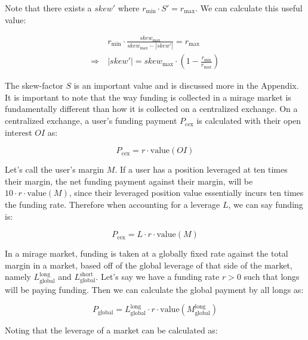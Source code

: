 \documentclass[letterpaper]{article}
\begin{document}
\begin{multicols}{2}
Note that there exists a $skew'$ where $r_{\text{min}} \cdot S' = r_{\text{max}}$. We can calculate this useful value:

\begin{align}
    &r_{\text{min}} \cdot \frac{skew_{\text{max}}}{skew_{\text{max}} - |skew'|} = r_{\text{max}} \\
    \label{eq:skew-at-max-funding}
    \Rightarrow~&|skew'| = skew_{\text{max}} \cdot (1 - \frac{r_{\text{min}}}{r_{\text{max}}})
\end{align}

The skew-factor $S$ is an important value and is discussed more in the Appendix. It is important to note that the way funding is collected in a mirage market is fundamentally different than how it is collected on a centralized exchange. On a centralized exchange, a user's funding payment $P_{\text{cex}}$ is calculated with their open interest $OI$ as:

\begin{equation}
    \label{eq:cex-funding}
    P_{\text{cex}} = r \cdot \text{value}(OI)
\end{equation}

Let's call the user's margin $M$. If a user has a position leveraged at ten times their margin, the net funding payment against their margin, will be $10 \cdot r \cdot \text{value}(M)$, since their leveraged position value essentially incurs ten times the funding rate. Therefore when accounting for a leverage $L$, we can say funding is:

\begin{equation}
    \label{eq:cex-funding-margin}
    P_{\text{cex}} = L \cdot r \cdot \text{value}(M)
\end{equation}

In a mirage market, funding is taken at a globally fixed rate against the total margin in a market, based off of the global leverage of that side of the market, namely $L^{\text{long}}_{\text{global}}$ and $L^{\text{short}}_{\text{global}}$. Let's say we have a funding rate $r > 0$ such that longs will be paying funding. Then we can calculate the global payment by all longs as:

\begin{equation}
    \label{eq:mirage-funding-margin}
    P_{\text{global}} = L^{\text{long}}_{\text{global}} \cdot r \cdot \text{value}(M^{\text{long}}_{\text{global}})
\end{equation}

Noting that the leverage of a market can be calculated as: 


\end{multicols}
\end{document}
